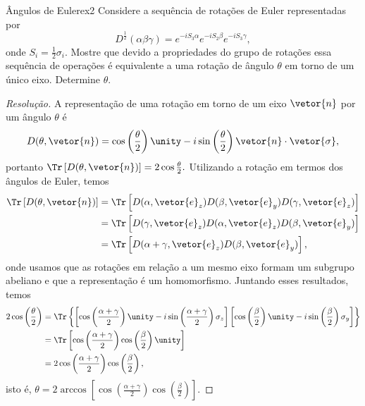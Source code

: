 \begin{exercício}{Ângulos de Euler}{ex2}
    Considere a sequência de rotações de Euler representadas por
    \begin{equation*}
        D^{\frac12}(\alpha \beta \gamma) = e^{-iS_3 \alpha} e^{-i S_2 \beta} e^{-i S_3 \gamma},
    \end{equation*}
    onde \(S_{i} = \frac12 \sigma_i.\) Mostre que devido a propriedades do grupo de rotações essa sequência de operações é equivalente a uma rotação de ângulo \(\theta\) em torno de um único eixo. Determine \(\theta\).
\end{exercício}
\begin{proof}[Resolução]
    A representação de uma rotação em torno de um eixo \(\vetor{n}\) por um ângulo \(\theta\) é
    \begin{equation*}
        D(\theta, \vetor{n}) = \cos\left(\frac\theta2\right) \unity - i\sin\left(\frac\theta2\right) \vetor{n}\cdot \vetor{\sigma},
    \end{equation*}
    portanto \(\Tr\left[D(\theta, \vetor{n})\right] = 2 \cos\frac\theta2.\) Utilizando a rotação em termos dos ângulos de Euler, temos
    \begin{align*}
        \Tr\left[D(\theta, \vetor{n})\right] &= \Tr\left[D(\alpha, \vetor{e}_z) D(\beta, \vetor{e}_y) D(\gamma, \vetor{e}_z)\right]\\
                                             &= \Tr\left[D(\gamma, \vetor{e}_z) D(\alpha, \vetor{e}_z) D(\beta, \vetor{e}_y)\right]\\
                                             &= \Tr\left[D(\alpha + \gamma, \vetor{e}_z)D(\beta, \vetor{e}_y)\right],
    \end{align*}
    onde usamos que as rotações em relação a um mesmo eixo formam um subgrupo abeliano e que a representação é um homomorfismo. Juntando esses resultados, temos
    \begin{align*}
        2\cos\left(\frac\theta2\right) &= \Tr\left\{\left[\cos\left(\frac{\alpha + \gamma}{2}\right)\unity - i \sin\left(\frac{\alpha + \gamma}2\right) \sigma_z\right]\left[\cos\left(\frac\beta2\right) \unity - i \sin\left(\frac\beta2\right) \sigma_y\right]\right\}\\
                          &= \Tr\left[\cos\left(\frac{\alpha + \gamma}{2}\right) \cos\left(\frac\beta2\right) \unity\right]\\
                          &= 2 \cos\left(\frac{\alpha + \gamma}2\right) \cos\left(\frac{\beta}{2}\right),
    \end{align*}
    isto é, \(\theta = 2\arccos\left[\cos\left(\frac{\alpha + \gamma}2\right)\cos\left(\frac{\beta}{2}\right)\right].\)
\end{proof}
